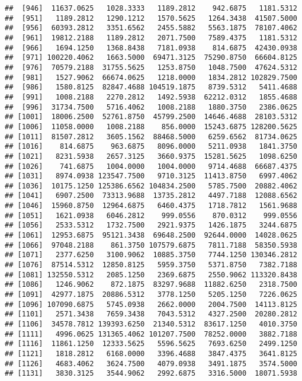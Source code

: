 \documentclass[]{article}
\begin{document}
\begin{verbatim}
##  [946]  11637.0625   1028.3333   1189.2812    942.6875   1181.5312
##  [951]   1189.2812   1290.1212   1570.5625   1264.3438  41507.5000
##  [956]  60393.2812   3351.6562   2455.5882   5563.1875  78107.4062
##  [961]  19812.2188   1189.2812   2071.7500   7589.4375   1181.5312
##  [966]   1694.1250   1368.8438   7181.0938    814.6875  42430.0938
##  [971] 100220.4062   1663.5000  69471.3125  75290.8750  66604.8125
##  [976]  70579.2188  31755.5625   1253.8750   1048.7500  47624.5312
##  [981]   1527.9062  66674.0625   1218.0000   1834.2812 102829.7500
##  [986]   1580.8125  82847.4688 104519.1875   8739.5312   5411.4688
##  [991]   1008.2188   2270.2812   1492.5938  62212.0312   1855.4688
##  [996]  31734.7500   5716.4062   1008.2188   1880.3750   2386.0625
## [1001]  18006.2500  52761.8750  45799.2500  14646.4688  28103.5312
## [1006]  11058.0000   1008.2188    856.0000  15243.6875 128200.5625
## [1011]  81507.2812   3605.1562  88468.5000   6259.6562  81734.0625
## [1016]    814.6875    963.6875   8096.0000   5211.0938   1841.3750
## [1021]   8231.5938   2657.3125   3660.9375  15281.5625   1098.6250
## [1026]    741.6875   1004.0000   1004.0000   9714.4688  66687.4375
## [1031]   8974.0938 123547.7500   9710.3125  11413.8750   6997.4062
## [1036]  10175.1250 125386.6562 104834.2500   5785.7500  20882.4062
## [1041]   6907.2500  73313.9688  13735.2812   4497.7188  12088.6562
## [1046]  15960.8750  12964.6875   6460.4375   1718.7812   1561.9688
## [1051]   1621.0938   6046.2812    999.0556    870.0312    999.0556
## [1056]   2533.5312   1732.7500   2921.9375   1426.1875   3244.6875
## [1061]  12953.6875  95121.3438  69648.2500  92644.0000  14028.0625
## [1066]  97048.2188    861.3750 107579.6875   7811.7188  58350.5938
## [1071]   2377.6250   3100.9062  10885.3750   7744.1250 130346.2812
## [1076]  87514.5312  12850.8125   5959.3750   5371.8750   7382.7188
## [1081] 132550.5312   2085.1250   2369.6875   2550.9062 113320.8438
## [1086]   1246.9062    872.1875  83297.9688  11882.6250   2318.7500
## [1091]  42977.1875  20886.5312   3778.1250   5205.1250   7226.0625
## [1096] 107090.6875   5745.0938   2662.0000   2004.7500  14113.8125
## [1101]   2571.3438   7659.3438   7043.5312   4327.2500  20280.2812
## [1106]  34578.7812 139393.6250  21340.5312  83617.1250   4010.3750
## [1111]   4996.0625 131365.4062 101207.7500  78252.0000   3882.7188
## [1116]  11861.1250  12333.5625   5596.5625   7693.6250   2499.1250
## [1121]   1818.2812   6168.0000   3396.4688   3847.4375   3641.8125
## [1126]   4683.4062   3624.7500   4079.0938   3491.1875   3574.5000
## [1131]   3830.3125   3544.9062   2992.6875   3316.5000  18071.5938

\end{verbatim}
\end{document}

